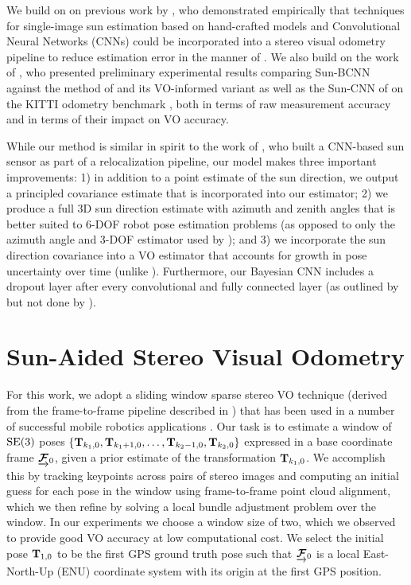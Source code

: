 We build on on previous work by \citet{2017_Clement_Improving}, who demonstrated empirically that techniques for single-image sun estimation based on hand-crafted models \citep{Lalonde2011-jw} and Convolutional Neural Networks (CNNs) \citep{Ma2016-at} could be incorporated into a stereo visual odometry pipeline to reduce estimation error in the manner of \citet{Lambert2012-sn}.
We also build on the work of \citet{2017_Peretroukhin_Reducing}, who presented preliminary experimental results comparing Sun-BCNN against the method of \citet{Lalonde2011-jw} and its VO-informed variant \citep{2017_Clement_Improving} as well as the Sun-CNN of \citet{Ma2016-at} on the KITTI odometry benchmark \citep{Geiger2013-ky}, both in terms of raw measurement accuracy and in terms of their impact on VO accuracy.

While our method is similar in spirit to the work of \citet{Ma2016-at}, who built a CNN-based sun sensor as part of a relocalization pipeline, our model makes three important improvements: 1) in addition to a point estimate of the sun direction, we output a principled covariance estimate that is incorporated into our estimator; 2) we produce a full 3D sun direction estimate with azimuth and zenith angles that is better suited to 6-DOF robot pose estimation problems (as opposed to only the azimuth angle and 3-DOF estimator used by \citet{Ma2016-at}); and 3) we incorporate the sun direction covariance into a VO estimator that accounts for growth in pose uncertainty over time (unlike \citet{2017_Clement_Improving}). 
Furthermore, our Bayesian CNN includes a dropout layer after every convolutional and fully connected layer (as outlined by \citet{Gal2016-ny} but not done by \citet{Kendall2016-zf}).


\section{Sun-Aided Stereo Visual Odometry} 
\label{sec:sun_bcnn-stereo-vo}
For this work, we adopt a sliding window sparse stereo VO technique (derived from the frame-to-frame pipeline described in ) that has been used in a number of successful mobile robotics applications \citep{Cheng2006-nl,Furgale2010-to,Geiger2011-xe,Kelly2008-mh}.
Our task is to estimate a window of $\mathrm{SE}(3)$ poses $\left\{\boldsymbol{\mathbf{T}}_{k_1,0}, \boldsymbol{\mathbf{T}}_{k_1+1,0}, \dots, \boldsymbol{\mathbf{T}}_{k_2-1, 0}, \boldsymbol{\mathbf{T}}_{k_2, 0}\right\}$ expressed in a base coordinate frame $\underrightarrow{ \boldsymbol{\mathbf{\mathcal{F}}} }_{0}$, given a prior estimate of the transformation $\boldsymbol{\mathbf{T}}_{k_1,0}$.
We accomplish this by tracking keypoints across pairs of stereo images and computing an initial guess for each pose in the window using frame-to-frame point cloud alignment, which we then refine by solving a local bundle adjustment problem over the window.
In our experiments we choose a window size of two, which we observed to provide good VO accuracy at low computational cost. 
We select the initial pose $\boldsymbol{\mathbf{T}}_{1,0}$ to be the first GPS ground truth pose such that $\underrightarrow{ \boldsymbol{\mathbf{\mathcal{F}}} }_{0}$ is a local East-North-Up (ENU) coordinate system with its origin at the first GPS position.

